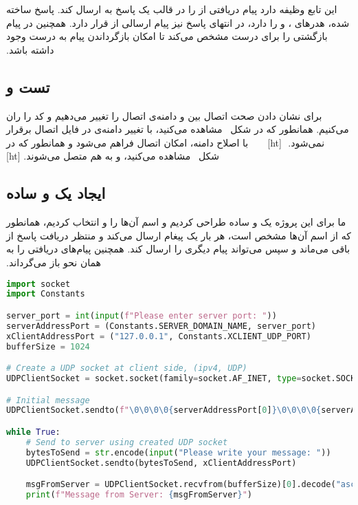 ‫این تابع وظیفه دارد پیام دریافتی از  را در قالب یک پاسخ  به  ارسال کند. پاسخ  ساخته شده، هدرهای ،  و  را دارد، در انتهای پاسخ نیز پیام ارسالی از  قرار دارد. همچنین در پیام بازگشتی  را برای  درست مشخص می‌کند تا امکان بازگرداندن پیام به  درست وجود داشته باشد. 
‫
‫\subsection{تست  و }
‫برای نشان دادن صحت اتصال  بین   و  دامنه‌ی اتصال را تغییر می‌دهیم و کد را ران می‌کنیم. همانطور که در شکل~ مشاهده می‌کنید، با تغییر دامنه‌ی  در فایل  اتصال برقرار نمی‌شود.
‫
‫[ht]
‫
‫
‫
‫
‫
‫با اصلاح دامنه، امکان اتصال فراهم می‌شود و همانطور که در شکل~ مشاهده می‌کنید،  و  به هم متصل می‌شوند. 
‫[ht]
‫
‫
‫
‫
‫
‫\subsection{ایجاد یک  و  ساده}
‫ما برای این پروژه یک  و  ساده طراحی کردیم و اسم آن‌‌ها را  و  انتخاب کردیم، همانطور که از اسم آن‌ها مشخص است،  هر بار یک پیغام ارسال می‌کند و منتظر دریافت پاسخ از  باقی می‌ماند و سپس می‌تواند پیام دیگری را ارسال کند. همچنین  پیام‌های دریافتی را به همان نحو باز می‌گرداند.
‫
\begin{latin}
\begin{lstlisting}[firstnumber=1, language=Python]
import socket
import Constants

server_port = int(input(f"Please enter server port: "))
serverAddressPort = (Constants.SERVER_DOMAIN_NAME, server_port)
xClientAddressPort = ("127.0.0.1", Constants.XCLIENT_UDP_PORT)
bufferSize = 1024

# Create a UDP socket at client side, (ipv4, UDP)
UDPClientSocket = socket.socket(family=socket.AF_INET, type=socket.SOCK_DGRAM)

# Initial message
UDPClientSocket.sendto(f"\0\0\0\0{serverAddressPort[0]}\0\0\0\0{serverAddressPort[1]}".encode("ascii"), xClientAddressPort)

while True:
    # Send to server using created UDP socket
    bytesToSend = str.encode(input("Please write your message: "))
    UDPClientSocket.sendto(bytesToSend, xClientAddressPort)

    msgFromServer = UDPClientSocket.recvfrom(bufferSize)[0].decode("ascii")
    print(f"Message from Server: {msgFromServer}")
\end{lstlisting}
\end{latin}

